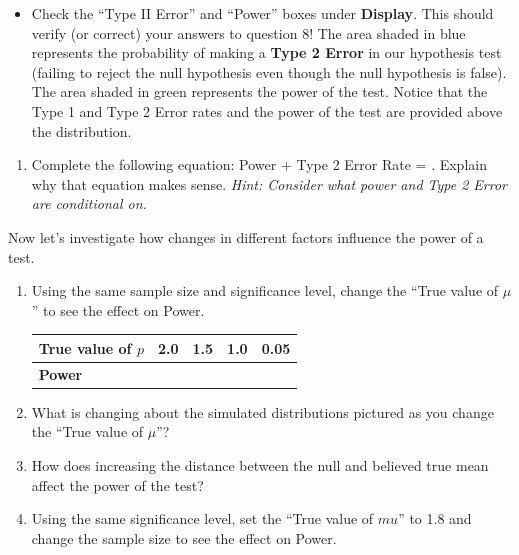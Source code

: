 \documentclass[
]{report}
\providecommand{\tightlist}{%
  \setlength{\itemsep}{0pt}\setlength{\parskip}{0pt}}
\begin{document}
\begin{itemize}
\tightlist
\item
  Check the ``Type II Error'' and ``Power'' boxes under \textbf{Display}. This should verify (or correct) your answers to question 8! The area shaded in blue represents the probability of making a \textbf{Type 2 Error} in our hypothesis test (failing to reject the null hypothesis even though the null hypothesis is false). The area shaded in green represents the power of the test. Notice that the Type 1 and Type 2 Error rates and the power of the test are provided above the distribution.
\end{itemize}

\begin{enumerate}
\def\labelenumi{\arabic{enumi}.}
\setcounter{enumi}{8}
\tightlist
\item
  Complete the following equation: Power + Type 2 Error Rate = . Explain why that equation makes sense. \emph{Hint: Consider what power and Type 2 Error are conditional on.}
  \vspace{0.6in}
\end{enumerate}

Now let's investigate how changes in different factors influence the power of a test.

\begin{enumerate}
\def\labelenumi{\arabic{enumi}.}
\setcounter{enumi}{9}
\item
  Using the same sample size and significance level, change the ``True value of \(\mu\)'' to see the effect on Power.
  \setlength\tabcolsep{0.5cm}

  \begin{longtable}{|l|c|c|c|c|}
  \hline
  \textbf{True value of $p$}& 2.0 & 1.5 & 1.0 & 0.05\\ \hline
  \textbf{Power} & & & &  \\ \hline
  \end{longtable}
\item
  What is changing about the simulated distributions pictured as you change the ``True value of \(\mu\)''?
  \vspace{0.5in}
\item
  How does increasing the distance between the null and believed true mean affect the power of the test?
  \vspace{0.5in}
\item
  Using the same significance level, set the ``True value of \(mu\)'' to 1.8 and change the sample size to see the effect on Power.
\end{enumerate}
\end{document}
